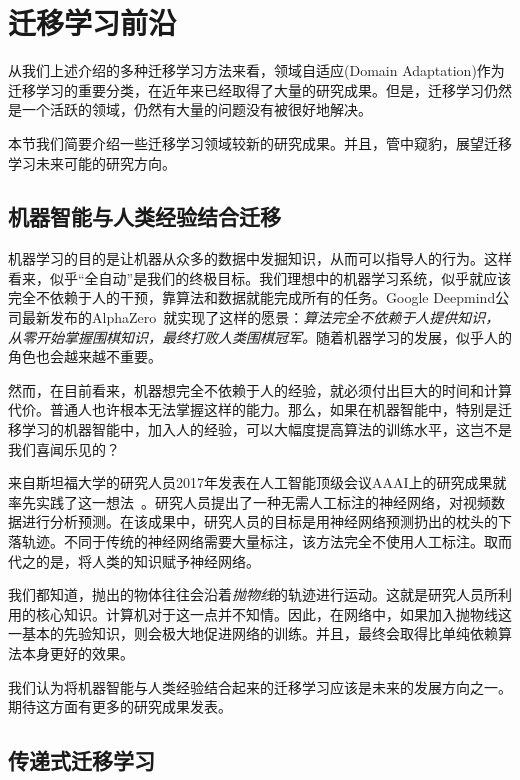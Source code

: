 \newpage

\section{迁移学习前沿}

从我们上述介绍的多种迁移学习方法来看，领域自适应(Domain Adaptation)作为迁移学习的重要分类，在近年来已经取得了大量的研究成果。但是，迁移学习仍然是一个活跃的领域，仍然有大量的问题没有被很好地解决。

本节我们简要介绍一些迁移学习领域较新的研究成果。并且，管中窥豹，展望迁移学习未来可能的研究方向。

\subsection{机器智能与人类经验结合迁移}

机器学习的目的是让机器从众多的数据中发掘知识，从而可以指导人的行为。这样看来，似乎“全自动”是我们的终极目标。我们理想中的机器学习系统，似乎就应该完全不依赖于人的干预，靠算法和数据就能完成所有的任务。Google Deepmind公司最新发布的AlphaZero~\cite{silver2017mastering}就实现了这样的愿景：\textit{算法完全不依赖于人提供知识，从零开始掌握围棋知识，最终打败人类围棋冠军。}随着机器学习的发展，似乎人的角色也会越来越不重要。

然而，在目前看来，机器想完全不依赖于人的经验，就必须付出巨大的时间和计算代价。普通人也许根本无法掌握这样的能力。那么，如果在机器智能中，特别是迁移学习的机器智能中，加入人的经验，可以大幅度提高算法的训练水平，这岂不是我们喜闻乐见的？

来自斯坦福大学的研究人员2017年发表在人工智能顶级会议AAAI上的研究成果就率先实践了这一想法~\cite{stewart2017label}。研究人员提出了一种无需人工标注的神经网络，对视频数据进行分析预测。在该成果中，研究人员的目标是用神经网络预测扔出的枕头的下落轨迹。不同于传统的神经网络需要大量标注，该方法完全不使用人工标注。取而代之的是，将人类的知识赋予神经网络。

我们都知道，抛出的物体往往会沿着\textit{抛物线}的轨迹进行运动。这就是研究人员所利用的核心知识。计算机对于这一点并不知情。因此，在网络中，如果加入抛物线这一基本的先验知识，则会极大地促进网络的训练。并且，最终会取得比单纯依赖算法本身更好的效果。

我们认为将机器智能与人类经验结合起来的迁移学习应该是未来的发展方向之一。期待这方面有更多的研究成果发表。

\subsection{传递式迁移学习}

